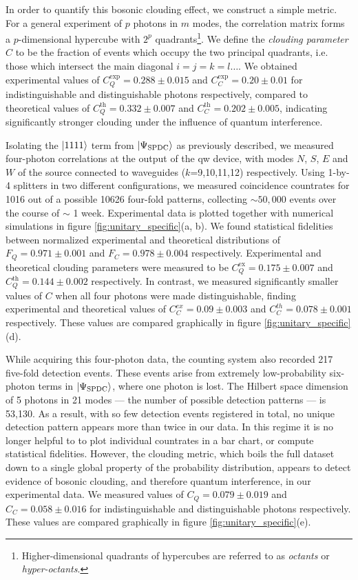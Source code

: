 In order to quantify this bosonic clouding effect, we construct a simple metric. For a general experiment of $p$ photons in $m$ modes, the correlation matrix forms a $p$-dimensional hypercube with $2^p$ quadrants\footnote{Higher-dimensional quadrants of hypercubes are referred to as \emph{octants} or \emph{hyper-octants}.}. We define the \emph{clouding parameter} $C$ to be the fraction of events which occupy the two principal quadrants, i.e. those which intersect the main diagonal $i=j=k=l \ldots$. We obtained experimental values of $C_Q^\text{exp} = 0.288 \pm 0.015$ and $C_C^\text{exp} = 0.20 \pm 0.01$ for indistinguishable and distinguishable photons respectively, compared to theoretical values of $C_Q^\text{th}=0.332 \pm 0.007$ and $C_C^\text{th}=0.202\pm0.005$, indicating significantly stronger clouding under the influence of quantum interference.

Isolating the $\mbox{$ | 1111 \rangle $}$ term from $\mbox{$ | \Psi_\text{SPDC} \rangle $}$ as previously described, we measured four-photon correlations at the output of the \gls{qw} device, with modes $N$, $S$, $E$ and $W$ of the source connected to waveguides ($k$=9,10,11,12) respectively. Using 1-by-4 splitters in two different configurations, we measured coincidence countrates for 1016 out of a possible 10626 four-fold patterns, collecting $\sim 50,000$ events over the course of $\sim$ 1 week. Experimental data is plotted together with numerical simulations in figure \ref{fig:unitary_specific}(a, b). We found statistical fidelities between normalized experimental and theoretical distributions of $F_Q = 0.971 \pm 0.001$ and $F_C = 0.978 \pm 0.004$ respectively. Experimental and theoretical clouding parameters were measured to be $C_Q^\text{ex}=0.175\pm0.007$ and $C_Q^\text{th}=0.144\pm0.002$ respectively. In contrast, we measured significantly smaller values of $C$ when all four photons were made distinguishable, finding experimental and theoretical values of $C_C^{ex}= 0.09\pm 0.003$ and $C_C^{th} = 0.078 \pm 0.001$ respectively. These values are compared graphically in figure \ref{fig:unitary_specific}(d).

While acquiring this four-photon data, the counting system also recorded 217 five-fold detection events. These events arise from extremely low-probability six-photon terms in $\mbox{$ | \Psi_\text{SPDC} \rangle $}$, where one photon is lost. The Hilbert space dimension of 5 photons in 21 modes --- the number of possible detection patterns --- is 53,130. As a result, with so few detection events registered in total, no unique detection pattern appears more than twice in our data. In this regime it is no longer helpful to to plot individual countrates in a bar chart, or compute statistical fidelities. However, the clouding metric, which boils the full dataset down to a single global property of the probability distribution, appears to detect evidence of bosonic clouding, and therefore quantum interference, in our experimental data. We measured values of $C_Q = 0.079\pm0.019$ and $C_C = 0.058 \pm 0.016$ for indistinguishable and distinguishable photons respectively. These values are compared graphically in figure \ref{fig:unitary_specific}(e).


